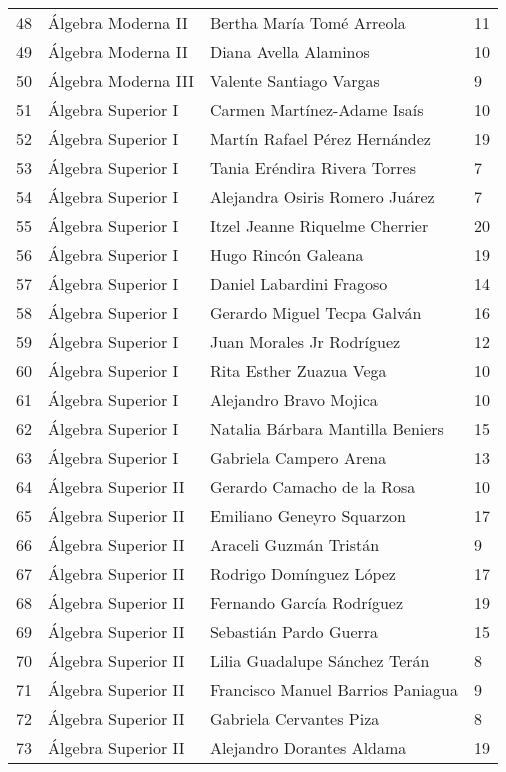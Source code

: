 \begin{table}[ht]
\begin{tabular}{rlll}
  48 & Álgebra Moderna II & Bertha María Tomé Arreola & 11 \\ 
  49 & Álgebra Moderna II & Diana Avella Alaminos & 10 \\ 
  50 & Álgebra Moderna III & Valente Santiago Vargas & 9 \\ 
  51 & Álgebra Superior I & Carmen Martínez-Adame Isaís & 10 \\ 
  52 & Álgebra Superior I & Martín Rafael Pérez Hernández & 19 \\ 
  53 & Álgebra Superior I & Tania Eréndira Rivera Torres & 7 \\ 
  54 & Álgebra Superior I & Alejandra Osiris Romero Juárez & 7 \\ 
  55 & Álgebra Superior I & Itzel Jeanne Riquelme Cherrier & 20 \\ 
  56 & Álgebra Superior I & Hugo Rincón Galeana & 19 \\ 
  57 & Álgebra Superior I & Daniel Labardini Fragoso & 14 \\ 
  58 & Álgebra Superior I & Gerardo Miguel Tecpa Galván & 16 \\ 
  59 & Álgebra Superior I & Juan Morales Jr Rodríguez & 12 \\ 
  60 & Álgebra Superior I & Rita Esther Zuazua Vega & 10 \\ 
  61 & Álgebra Superior I & Alejandro Bravo Mojica & 10 \\ 
  62 & Álgebra Superior I & Natalia Bárbara Mantilla Beniers & 15 \\ 
  63 & Álgebra Superior I & Gabriela Campero Arena & 13 \\ 
  64 & Álgebra Superior II & Gerardo Camacho de la Rosa & 10 \\ 
  65 & Álgebra Superior II & Emiliano Geneyro Squarzon & 17 \\ 
  66 & Álgebra Superior II & Araceli Guzmán Tristán & 9 \\ 
  67 & Álgebra Superior II & Rodrigo Domínguez López & 17 \\ 
  68 & Álgebra Superior II & Fernando García Rodríguez & 19 \\ 
  69 & Álgebra Superior II & Sebastián Pardo Guerra & 15 \\ 
  70 & Álgebra Superior II & Lilia Guadalupe Sánchez Terán & 8 \\ 
  71 & Álgebra Superior II & Francisco Manuel Barrios Paniagua & 9 \\ 
  72 & Álgebra Superior II & Gabriela Cervantes Piza & 8 \\ 
  73 & Álgebra Superior II & Alejandro Dorantes Aldama & 19 \\ 

\end{tabular}
\end{table}
